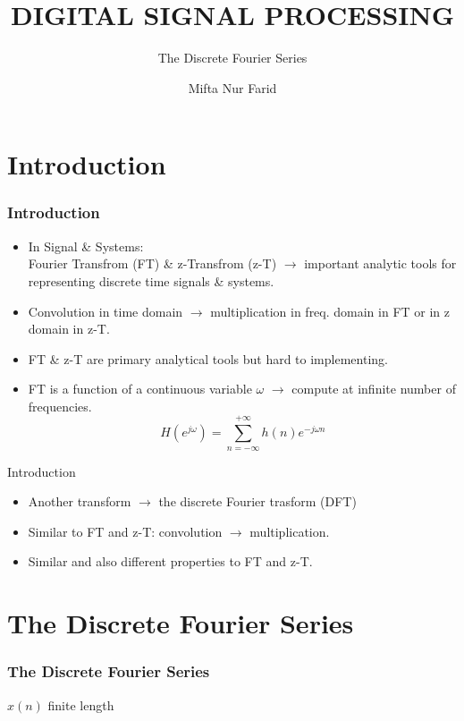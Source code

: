 \documentclass[pdflatex,compress,mathserif]{beamer}
\title{DIGITAL SIGNAL PROCESSING}
\subtitle{The Discrete Fourier Series}
\author{Mifta Nur Farid}
\begin{document}
\maketitle

\section{Introduction}

\begin{frame}
	\frametitle{Introduction}
	\begin{itemize}
		\item In Signal \& Systems:\\
		Fourier Transfrom (FT) \& z-Transfrom (z-T) $\rightarrow$ important analytic tools for representing discrete time signals \& systems.
		\item Convolution in time domain $\rightarrow$ multiplication in freq. domain in FT or in z domain in z-T.
		\item FT \& z-T are primary analytical tools but hard to implementing.
		\item FT is a function of a continuous variable $\omega$ $\rightarrow$ compute at infinite number of frequencies. $$ H(e^{j\omega}) = \sum\limits_{n=-\infty}^{+\infty} h(n)e^{-j \omega n} $$
	\end{itemize}
\end{frame}

\begin{frame}{Introduction}
	\begin{itemize}
		\item Another transform $\rightarrow$ the discrete Fourier trasform (DFT)
		\item Similar to FT and z-T: convolution $\rightarrow$ multiplication.
		\item Similar and also different properties to FT and z-T.
	\end{itemize}
\end{frame}

\section{The Discrete Fourier Series}

\begin{frame}
	\frametitle{The Discrete Fourier Series}
	$ x(n) $ finite length
	
\end{frame}
\end{document}
